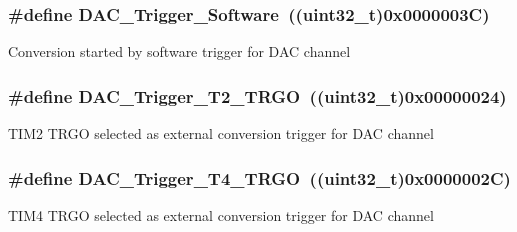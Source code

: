 \subsubsection[{\texorpdfstring{D\+A\+C\+\_\+\+Trigger\+\_\+\+Software}{DAC_Trigger_Software}}]{\setlength{\rightskip}{0pt plus 5cm}\#define D\+A\+C\+\_\+\+Trigger\+\_\+\+Software~((uint32\+\_\+t)0x0000003\+C)}\hypertarget{group___d_a_c__trigger__selection_gadef77bb8bbd109232900902402ef637f}{}\label{group___d_a_c__trigger__selection_gadef77bb8bbd109232900902402ef637f}
Conversion started by software trigger for D\+AC channel 
\subsubsection[{\texorpdfstring{D\+A\+C\+\_\+\+Trigger\+\_\+\+T2\+\_\+\+T\+R\+GO}{DAC_Trigger_T2_TRGO}}]{\setlength{\rightskip}{0pt plus 5cm}\#define D\+A\+C\+\_\+\+Trigger\+\_\+\+T2\+\_\+\+T\+R\+GO~((uint32\+\_\+t)0x00000024)}\hypertarget{group___d_a_c__trigger__selection_ga3bfbff1e03af1fd17a57a43e57420fe6}{}\label{group___d_a_c__trigger__selection_ga3bfbff1e03af1fd17a57a43e57420fe6}
T\+I\+M2 T\+R\+GO selected as external conversion trigger for D\+AC channel 
\subsubsection[{\texorpdfstring{D\+A\+C\+\_\+\+Trigger\+\_\+\+T4\+\_\+\+T\+R\+GO}{DAC_Trigger_T4_TRGO}}]{\setlength{\rightskip}{0pt plus 5cm}\#define D\+A\+C\+\_\+\+Trigger\+\_\+\+T4\+\_\+\+T\+R\+GO~((uint32\+\_\+t)0x0000002\+C)}\hypertarget{group___d_a_c__trigger__selection_ga58ccb2de3d22d66ee975152f5edb330a}{}\label{group___d_a_c__trigger__selection_ga58ccb2de3d22d66ee975152f5edb330a}
T\+I\+M4 T\+R\+GO selected as external conversion trigger for D\+AC channel 
